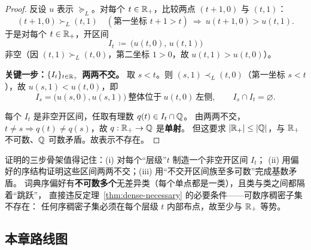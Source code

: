 \begin{proof}
反设 $u$ 表示 $\succeq_L$。对每个 $t\in\mathbb{R}_+$，比较两点 $(t+1,0)$ 与 $(t,1)$：
\[
(t+1,0)\succ_L(t,1)\quad(\text{第一坐标 }t+1>t)
\ \Longrightarrow\ u(t+1,0)>u(t,1).
\]
于是对每个 $t\in\mathbb{R}_+$，开区间
\[
I_t\ \coloneqq\ \bigl(u(t,0),\,u(t,1)\bigr)
\]
非空（因 $(t,1)\succ_L(t,0)$，第二坐标 $1>0$，故 $u(t,1)>u(t,0)$）。

\textbf{关键一步：$\{I_t\}_{t\in\mathbb{R}_+}$ 两两不交。}
取 $s<t$。则 $(s,1)\prec_L(t,0)$（第一坐标 $s<t$），故 $u(s,1)<u(t,0)$，即
\[
I_s=\bigl(u(s,0),u(s,1)\bigr)\ \text{整体位于}\ u(t,0)\ \text{左侧},\qquad
I_s\cap I_t=\varnothing.
\]

每个 $I_t$ 是非空开区间，任取有理数 $q(t)\in I_t\cap\mathbb{Q}$。
由两两不交，$t\ne s\Rightarrow q(t)\ne q(s)$，故 $q:\mathbb{R}_+\to\mathbb{Q}$ 是\textbf{单射}。
但这要求 $|\mathbb{R}_+|\le|\mathbb{Q}|$，与 $\mathbb{R}_+$ 不可数、$\mathbb{Q}$ 可数矛盾。故表示不存在。
\end{proof}

\begin{remark}[反例的结构]\label{rem:lex-structure}
证明的三步骨架值得记住：(i) 对每个“层级”$t$ 制造一个非空开区间 $I_t$；
(ii) 用偏好的序结构证明这些区间两两不交；(iii) 用“不交开区间族至多可数”完成基数矛盾。
词典序偏好有\textbf{不可数多个}无差异类（每个单点都是一类），且类与类之间都隔着“跳跃”，
直接违反定理~\ref{thm:dense-necessary} 的必要条件——可数序稠密子集不存在：
任何序稠密子集必须在每个层级 $t$ 内部布点，故至少与 $\mathbb{R}_+$ 等势。
\end{remark}

\subsection{本章路线图}

